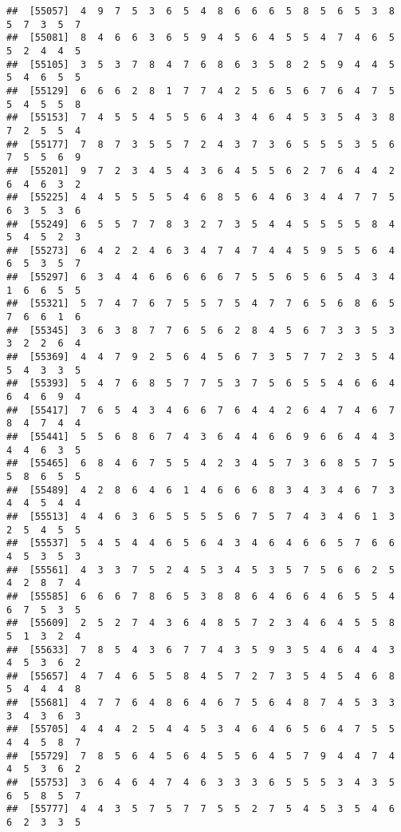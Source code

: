 \documentclass[
]{book}
\begin{document}
\begin{verbatim}
##  [55057]  4  9  7  5  3  6  5  4  8  6  6  6  5  8  5  6  5  3  8  5  7  3  5  7
##  [55081]  8  4  6  6  3  6  5  9  4  5  6  4  5  5  4  7  4  6  5  5  2  4  4  5
##  [55105]  3  5  3  7  8  4  7  6  8  6  3  5  8  2  5  9  4  4  5  5  4  6  5  5
##  [55129]  6  6  6  2  8  1  7  7  4  2  5  6  5  6  7  6  4  7  5  5  4  5  5  8
##  [55153]  7  4  5  5  4  5  5  6  4  3  4  6  4  5  3  5  4  3  8  7  2  5  5  4
##  [55177]  7  8  7  3  5  5  7  2  4  3  7  3  6  5  5  5  3  5  6  7  5  5  6  9
##  [55201]  9  7  2  3  4  5  4  3  6  4  5  5  6  2  7  6  4  4  2  6  4  6  3  2
##  [55225]  4  4  5  5  5  5  4  6  8  5  6  4  6  3  4  4  7  7  5  6  3  5  3  6
##  [55249]  6  5  5  7  7  8  3  2  7  3  5  4  4  5  5  5  5  8  4  5  4  5  2  3
##  [55273]  6  4  2  2  4  6  3  4  7  4  7  4  4  5  9  5  5  6  4  6  5  3  5  7
##  [55297]  6  3  4  4  6  6  6  6  6  7  5  5  6  5  6  5  4  3  4  1  6  6  5  5
##  [55321]  5  7  4  7  6  7  5  5  7  5  4  7  7  6  5  6  8  6  5  7  6  6  1  6
##  [55345]  3  6  3  8  7  7  6  5  6  2  8  4  5  6  7  3  3  5  3  3  2  2  6  4
##  [55369]  4  4  7  9  2  5  6  4  5  6  7  3  5  7  7  2  3  5  4  5  4  3  3  5
##  [55393]  5  4  7  6  8  5  7  7  5  3  7  5  6  5  5  4  6  6  4  6  4  6  9  4
##  [55417]  7  6  5  4  3  4  6  6  7  6  4  4  2  6  4  7  4  6  7  8  4  7  4  4
##  [55441]  5  5  6  8  6  7  4  3  6  4  4  6  6  9  6  6  4  4  3  4  4  6  3  5
##  [55465]  6  8  4  6  7  5  5  4  2  3  4  5  7  3  6  8  5  7  5  5  8  6  5  5
##  [55489]  4  2  8  6  4  6  1  4  6  6  6  8  3  4  3  4  6  7  3  4  4  5  4  4
##  [55513]  4  4  6  3  6  5  5  5  5  6  7  5  7  4  3  4  6  1  3  2  5  4  5  5
##  [55537]  5  4  5  4  4  6  5  6  4  3  4  6  4  6  6  5  7  6  6  4  5  3  5  3
##  [55561]  4  3  3  7  5  2  4  5  3  4  5  3  5  7  5  6  6  2  5  4  2  8  7  4
##  [55585]  6  6  6  7  8  6  5  3  8  8  6  4  6  6  4  6  5  5  4  6  7  5  3  5
##  [55609]  2  5  2  7  4  3  6  4  8  5  7  2  3  4  6  4  5  5  8  5  1  3  2  4
##  [55633]  7  8  5  4  3  6  7  7  4  3  5  9  3  5  4  6  4  4  3  4  5  3  6  2
##  [55657]  4  7  4  6  5  5  8  4  5  7  2  7  3  5  4  5  4  6  8  5  4  4  4  8
##  [55681]  4  7  7  6  4  8  6  4  6  7  5  6  4  8  7  4  5  3  3  3  4  3  6  3
##  [55705]  4  4  4  2  5  4  4  5  3  4  6  4  6  5  6  4  7  5  5  4  4  5  8  7
##  [55729]  7  8  5  6  4  5  6  4  5  5  6  4  5  7  9  4  4  7  4  4  5  3  6  2
##  [55753]  3  6  4  6  4  7  4  6  3  3  3  6  5  5  5  3  4  3  5  6  5  8  5  7
##  [55777]  4  4  3  5  7  5  7  7  5  5  2  7  5  4  5  3  5  4  6  6  2  3  3  5

\end{verbatim}
\end{document}
